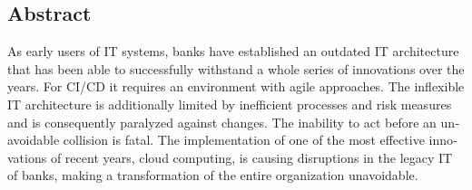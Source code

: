 

\begin{otherlanguage}{american}
	\chapter*{Abstract}
	As early users of IT systems, banks have established an outdated IT architecture that has been able to successfully withstand a whole series of innovations over the years. 
    For CI/CD it requires an environment with agile approaches. The inflexible IT architecture is additionally limited by inefficient processes and risk measures and is consequently paralyzed against changes. The inability to act before an unavoidable collision is fatal.
    The implementation of one of the most effective innovations of recent years, cloud computing, is causing disruptions in the legacy IT of banks, making a transformation of the entire organization unavoidable.
\end{otherlanguage}